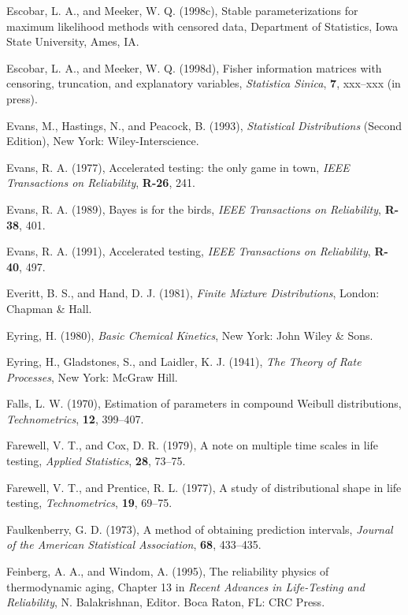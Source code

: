 \begin{thebibliography}{999}
Escobar, L. A., and Meeker, W. Q. (1998c), Stable parameterizations
for maximum likelihood methods with censored data, Department of
Statistics, Iowa State University, Ames, IA.

Escobar, L. A., and Meeker, W. Q. (1998d), Fisher information matrices
with censoring, truncation, and explanatory variables, {\em Statistica
Sinica}, {\bf 7}, xxx--xxx (in press).

Evans, M., Hastings, N., and Peacock, B.  (1993), {\em Statistical
Distributions} (Second Edition), New York: Wiley-Interscience.

Evans, R. A. (1977), Accelerated testing: the only game in town,
{\em IEEE Transactions on Reliability}, {\bf R-26}, 241.

Evans, R. A. (1989), Bayes is for the birds, {\em IEEE Transactions on
Reliability}, {\bf R-38}, 401.

Evans, R. A. (1991), Accelerated testing, {\em IEEE Transactions on
Reliability}, {\bf R-40}, 497.

Everitt, B. S., and Hand, D. J. (1981), {\em Finite Mixture
Distributions}, London: Chapman \& Hall.

Eyring, H. (1980), {\em Basic Chemical Kinetics}, New York: John Wiley \& Sons.

Eyring, H., Gladstones, S., and Laidler, K. J. (1941), {\em The Theory
of Rate Processes}, New York:
McGraw Hill.

Falls, L. W. (1970), Estimation of parameters in compound Weibull
distributions, {\em Technometrics}, {\bf 12}, 399--407.

Farewell, V. T., and Cox, D. R. (1979), A note on multiple time scales
in life testing, {\em Applied Statistics}, {\bf 28}, 73--75.

Farewell, V. T., and Prentice, R. L. (1977), A study of distributional
shape in life testing, {\em Technometrics}, {\bf 19}, 69--75.

Faulkenberry, G. D. (1973), A method of obtaining prediction intervals,
{\em Journal of the American Statistical Association}, 
{\bf 68}, 433--435.

Feinberg, A. A., and Windom, A. (1995), The reliability physics of
thermodynamic aging, Chapter 13 in {\em Recent Advances in
Life-Testing and Reliability}, N. Balakrishnan, Editor. Boca Raton,
FL: CRC Press.


\end{thebibliography}
